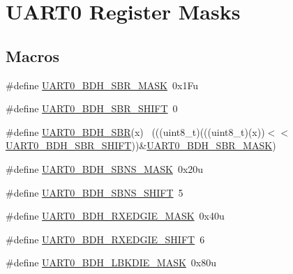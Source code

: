 \hypertarget{group___u_a_r_t0___register___masks}{}\section{U\+A\+R\+T0 Register Masks}
\label{group___u_a_r_t0___register___masks}
\subsection*{Macros}
\begin{DoxyCompactItemize}
\item 
\#define \hyperlink{group___u_a_r_t0___register___masks_ga594b77e6abc9054650d85c9d7e2c4cfa}{U\+A\+R\+T0\+\_\+\+B\+D\+H\+\_\+\+S\+B\+R\+\_\+\+M\+A\+SK}~0x1\+Fu
\item 
\#define \hyperlink{group___u_a_r_t0___register___masks_ga5262e2ab11a18782a8cceb9a63affe27}{U\+A\+R\+T0\+\_\+\+B\+D\+H\+\_\+\+S\+B\+R\+\_\+\+S\+H\+I\+FT}~0
\item 
\#define \hyperlink{group___u_a_r_t0___register___masks_ga942863cb4a3cc74988807d489e7fb4c8}{U\+A\+R\+T0\+\_\+\+B\+D\+H\+\_\+\+S\+BR}(x)                                              ~(((uint8\+\_\+t)(((uint8\+\_\+t)(x))$<$$<$\hyperlink{group___u_a_r_t0___register___masks_ga5262e2ab11a18782a8cceb9a63affe27}{U\+A\+R\+T0\+\_\+\+B\+D\+H\+\_\+\+S\+B\+R\+\_\+\+S\+H\+I\+FT}))\&\hyperlink{group___u_a_r_t0___register___masks_ga594b77e6abc9054650d85c9d7e2c4cfa}{U\+A\+R\+T0\+\_\+\+B\+D\+H\+\_\+\+S\+B\+R\+\_\+\+M\+A\+SK})
\item 
\#define \hyperlink{group___u_a_r_t0___register___masks_gaed905f161d823efa3beca3e0e93d39ff}{U\+A\+R\+T0\+\_\+\+B\+D\+H\+\_\+\+S\+B\+N\+S\+\_\+\+M\+A\+SK}~0x20u
\item 
\#define \hyperlink{group___u_a_r_t0___register___masks_gad8909b0c50ce1d7436a2bdb2d99cce1a}{U\+A\+R\+T0\+\_\+\+B\+D\+H\+\_\+\+S\+B\+N\+S\+\_\+\+S\+H\+I\+FT}~5
\item 
\#define \hyperlink{group___u_a_r_t0___register___masks_ga345980eca350a190e8fc3e39109a0eea}{U\+A\+R\+T0\+\_\+\+B\+D\+H\+\_\+\+R\+X\+E\+D\+G\+I\+E\+\_\+\+M\+A\+SK}~0x40u
\item 
\#define \hyperlink{group___u_a_r_t0___register___masks_gad8f5143553887979638377da46673dfc}{U\+A\+R\+T0\+\_\+\+B\+D\+H\+\_\+\+R\+X\+E\+D\+G\+I\+E\+\_\+\+S\+H\+I\+FT}~6
\item 
\#define \hyperlink{group___u_a_r_t0___register___masks_ga84132309b565d272671dde5d912a1611}{U\+A\+R\+T0\+\_\+\+B\+D\+H\+\_\+\+L\+B\+K\+D\+I\+E\+\_\+\+M\+A\+SK}~0x80u
$$
\end{DoxyCompactItemize}
